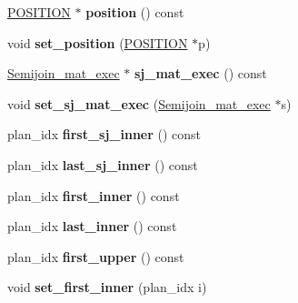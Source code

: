 \begin{DoxyCompactItemize}
\mbox{\hyperlink{structst__position}{P\+O\+S\+I\+T\+I\+ON}} $\ast$ {\bfseries position} () const
\item 
\mbox{\label{classQEP__shared__owner_a0600634792b4669c43515122cbac89b6}} 
void {\bfseries set\+\_\+position} (\mbox{\hyperlink{structst__position}{P\+O\+S\+I\+T\+I\+ON}} $\ast$p)
\item 
\mbox{\label{classQEP__shared__owner_ab4f31760ad1ac611ea5745b5968d8e75}} 
\mbox{\hyperlink{classSemijoin__mat__exec}{Semijoin\+\_\+mat\+\_\+exec}} $\ast$ {\bfseries sj\+\_\+mat\+\_\+exec} () const
\item 
\mbox{\label{classQEP__shared__owner_af82f8daebc7e31e63f75a9334a64c884}} 
void {\bfseries set\+\_\+sj\+\_\+mat\+\_\+exec} (\mbox{\hyperlink{classSemijoin__mat__exec}{Semijoin\+\_\+mat\+\_\+exec}} $\ast$s)
\item 
\mbox{\label{classQEP__shared__owner_a2aa26643292ae07eb105206405c72bc2}} 
plan\+\_\+idx {\bfseries first\+\_\+sj\+\_\+inner} () const
\item 
\mbox{\label{classQEP__shared__owner_aff6d8c7ab7ad40d67c44889caace2975}} 
plan\+\_\+idx {\bfseries last\+\_\+sj\+\_\+inner} () const
\item 
\mbox{\label{classQEP__shared__owner_a64071cfc3d072577834d6c898ac0252e}} 
plan\+\_\+idx {\bfseries first\+\_\+inner} () const
\item 
\mbox{\label{classQEP__shared__owner_acf15bf73317b27a3081b163cb6275c0c}} 
plan\+\_\+idx {\bfseries last\+\_\+inner} () const
\item 
\mbox{\label{classQEP__shared__owner_a23282924ea0252b0de47813a9b926bb8}} 
plan\+\_\+idx {\bfseries first\+\_\+upper} () const
\item 
\mbox{\label{classQEP__shared__owner_a037ce5098fe8e87df51f70ae894297b5}} 
void {\bfseries set\+\_\+first\+\_\+inner} (plan\+\_\+idx i)
\item 
\mbox{\label{classQEP__shared__owner_a78c8db6556e4708db0f480e261412f29}} 

\end{DoxyCompactItemize}
